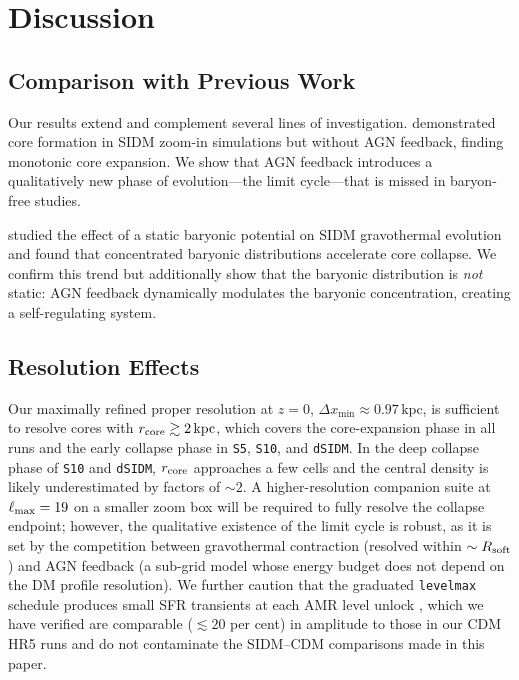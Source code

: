 \documentclass[fleqn,usenatbib]{mnras}
\newcommand{\code}[1]{\texttt{#1}}
\newcommand{\kpc}{\,\mathrm{kpc}}
\newcommand{\rcore}{r_{\rm core}}
\begin{document}
\section{Discussion}
\label{sec:discussion}

\subsection{Comparison with Previous Work}

Our results extend and complement several lines of investigation.
\citet{Elbert2018} demonstrated core formation in SIDM zoom-in
simulations but without AGN feedback, finding monotonic core expansion.
We show that AGN feedback introduces a qualitatively new phase of
evolution---the limit cycle---that is missed in baryon-free studies.

\citet{Sameie2021} studied the effect of a static baryonic potential on
SIDM gravothermal evolution and found that concentrated baryonic
distributions accelerate core collapse.  We confirm this trend but
additionally show that the baryonic distribution is \emph{not} static:
AGN feedback dynamically modulates the baryonic concentration, creating
a self-regulating system.

\subsection{Resolution Effects}

Our maximally refined proper resolution at $z=0$,
$\Delta x_{\min} \approx 0.97\kpc$, is sufficient to resolve cores
with $\rcore \gtrsim 2\kpc$, which covers the core-expansion phase
in all runs and the early collapse phase in \code{S5}, \code{S10},
and \code{dSIDM}.  In the deep collapse phase of \code{S10} and
\code{dSIDM}, $\rcore$ approaches a few cells and the central
density is likely underestimated by factors of $\sim 2$.  A
higher-resolution companion suite at $\ell_{\rm max}=19$ on a
smaller zoom box will be required to fully resolve the collapse
endpoint; however, the qualitative existence of the limit cycle
is robust, as it is set by the competition between gravothermal
contraction (resolved within $\sim R_{\rm soft}$) and AGN
feedback (a sub-grid model whose energy budget does not depend
on the DM profile resolution).  We further caution that the
graduated \code{levelmax} schedule produces small SFR transients
at each AMR level unlock \citep{Snaith2018}, which we have
verified are comparable ($\lesssim 20$ per cent) in amplitude to
those in our CDM HR5 runs and do not contaminate the SIDM--CDM
comparisons made in this paper.
\end{document}
